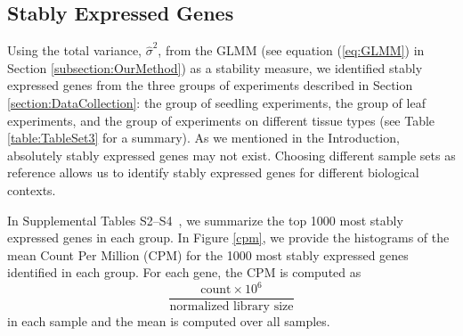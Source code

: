 \documentclass[fleqn,10pt,lineno]{wlpeerj} %
\newcommand{\supptabletwo}{S2--S4~}
\begin{document}
\subsection{Stably Expressed Genes}\label{section:stablyExpressedGene}
Using the total variance, $\hat\sigma^2$, from the GLMM (see
equation (\ref{eq:GLMM}) in Section \ref{subsection:OurMethod}) as a
stability measure, we identified stably expressed genes from the three groups
of experiments described in Section \ref{section:DataCollection}: the group of
seedling experiments, the group of leaf experiments, and the group of
experiments on different tissue types (see Table \ref{table:TableSet3} for a
summary).
As we mentioned in the Introduction, absolutely stably expressed genes may not
exist.  Choosing different sample sets as reference allows us to identify
stably expressed genes for different biological contexts.

In Supplemental Tables \supptabletwo, we summarize the
top 1000 most stably expressed genes in each group.  In Figure \ref{cpm}, we
provide the histograms of the mean Count Per Million (CPM) for the 1000
most stably expressed genes identified in each group. For each gene, the CPM
is computed as
\begin{equation}\label{eq:cpm}
\dfrac{ \text{count} \times 10^6 }{ \text{normalized library size}} 
\end{equation}
in each sample and the mean is computed over all samples.
\end{document}
